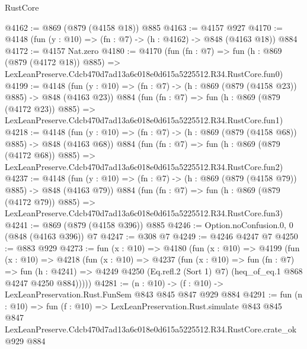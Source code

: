 \begin{lexlean}{RustCore}
\begin{coremodule}
@4162 := @869 (@879 (@4158 @18)) @885
@4163 := @4157 @927
@4170 := @4148 (fun (y : @10) => (fn : @7) -> (h : @4162) -> @848 (@4163 @18)) @884
@4172 := @4157 Nat.zero
@4180 := @4170
    (fun (fn : @7) =>
    fun (h : @869 (@879 (@4172 @18)) @885) =>
    LexLeanPreserve.Cdcb470d7ad13a6c018e0d615a5225512.R34.RustCore.fun0)
@4199 := @4148
    (fun (y : @10) => (fn : @7) -> (h : @869 (@879 (@4158 @23)) @885) -> @848 (@4163 @23))
    @884
    (fun (fn : @7) =>
    fun (h : @869 (@879 (@4172 @23)) @885) =>
    LexLeanPreserve.Cdcb470d7ad13a6c018e0d615a5225512.R34.RustCore.fun1)
@4218 := @4148
    (fun (y : @10) => (fn : @7) -> (h : @869 (@879 (@4158 @68)) @885) -> @848 (@4163 @68))
    @884
    (fun (fn : @7) =>
    fun (h : @869 (@879 (@4172 @68)) @885) =>
    LexLeanPreserve.Cdcb470d7ad13a6c018e0d615a5225512.R34.RustCore.fun2)
@4237 := @4148
    (fun (y : @10) => (fn : @7) -> (h : @869 (@879 (@4158 @79)) @885) -> @848 (@4163 @79))
    @884
    (fun (fn : @7) =>
    fun (h : @869 (@879 (@4172 @79)) @885) =>
    LexLeanPreserve.Cdcb470d7ad13a6c018e0d615a5225512.R34.RustCore.fun3)
@4241 := @869 (@879 (@4158 @396)) @885
@4246 := Option.noConfusion.{0, 0} (@848 (@4163 @396)) @7
@4247 := @308 @7
@4249 := @4246 @4247 @7
@4250 := @883 @929
@4273 := fun (x : @10) =>
  @4180
    (fun (x : @10) =>
    @4199
      (fun (x : @10) =>
      @4218
        (fun (x : @10) =>
        @4237
          (fun (x : @10) =>
          fun (fn : @7) =>
          fun (h : @4241) =>
          @4249 @4250 (Eq.refl.{2} (Sort 1) @7) (heq_of_eq.{1} @868 @4247 @4250 @884)))))
@4281 := (n : @10) -> (f : @10) -> LexLeanPreservation.Rust.FunSem @843 @845 @847 @929 @884
@4291 := fun (n : @10) =>
  fun (f : @10) =>
  LexLeanPreservation.Rust.simulate
    @843
    @845
    @847
    LexLeanPreserve.Cdcb470d7ad13a6c018e0d615a5225512.R34.RustCore.crate_ok
    @929
    @884
\end{coremodule}
\end{lexlean}
